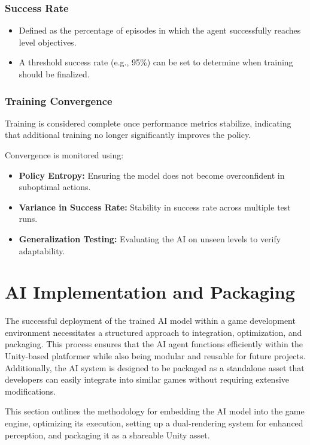 \documentclass[12pt,oneside,openright,a4paper]{cpe-english-project}
\begin{document}
\subsubsection{Success Rate}
\begin{itemize}
\item  Defined as the percentage of episodes in which the agent successfully reaches level objectives.
\item  A threshold success rate (e.g., 95\%) can be set to determine when training should be finalized.
\end{itemize}
\subsubsection{Training Convergence}
Training is considered complete once performance metrics stabilize, indicating that additional training no longer significantly improves the policy.\par Convergence is monitored using:\par
\begin{itemize}
\item  \textbf{Policy Entropy:} Ensuring the model does not become overconfident in suboptimal actions.
\item  \textbf{Variance in Success Rate:} Stability in success rate across multiple test runs.
\item  \textbf{Generalization Testing:} Evaluating the AI on unseen levels to verify adaptability.
\end{itemize}

\section {AI Implementation and Packaging}
The successful deployment of the trained AI model within a game development environment necessitates a structured approach to integration, optimization, and packaging. This process ensures that the AI agent functions efficiently within the Unity-based platformer while also being modular and reusable for future projects. Additionally, the AI system is designed to be packaged as a standalone asset that developers can easily integrate into similar games without requiring extensive modifications.\par
This section outlines the methodology for embedding the AI model into the game engine, optimizing its execution, setting up a dual-rendering system for enhanced perception, and packaging it as a shareable Unity asset.\par
\end{document}
